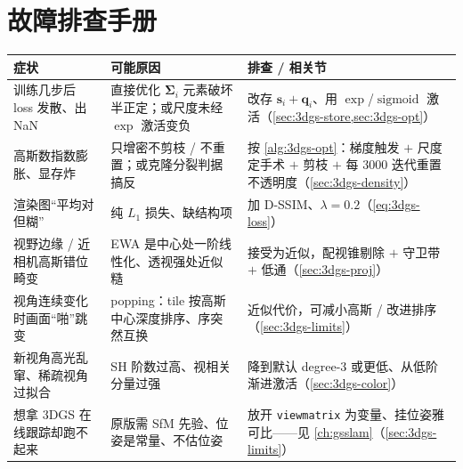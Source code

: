 \section*{故障排查手册}
\begin{table}[H]\centering
\small
\begin{tabular}{@{}p{}p{}p{}@{}}
\toprule
症状 & 可能原因 & 排查 / 相关节 \\
\midrule
训练几步后 loss 发散、出 NaN & 直接优化 $\boldsymbol\Sigma_i$ 元素破坏半正定；或尺度未经 $\exp$ 激活变负 & 改存 $\mathbf s_i+\mathbf q_i$、用 $\exp$/$\operatorname{sigmoid}$ 激活（\cref{sec:3dgs-store,sec:3dgs-opt}）\\
高斯数指数膨胀、显存炸 & 只增密不剪枝 / 不重置；或克隆分裂判据搞反 & 按 \cref{alg:3dgs-opt}：梯度触发 $+$ 尺度定手术 $+$ 剪枝 $+$ 每 $3000$ 迭代重置不透明度（\cref{sec:3dgs-density}）\\
渲染图“平均对但糊” & 纯 $L_1$ 损失、缺结构项 & 加 D-SSIM、$\lambda=0.2$（\cref{eq:3dgs-loss}）\\
视野边缘 / 近相机高斯错位畸变 & EWA 是中心处一阶线性化、透视强处近似糙 & 接受为近似，配视锥剔除 $+$ 守卫带 $+$ 低通（\cref{sec:3dgs-proj}）\\
视角连续变化时画面“啪”跳变 & popping：tile 按高斯中心深度排序、序突然互换 & 近似代价，可减小高斯 / 改进排序（\cref{sec:3dgs-limits}）\\
新视角高光乱窜、稀疏视角过拟合 & SH 阶数过高、视相关分量过强 & 降到默认 degree-3 或更低、从低阶渐进激活（\cref{sec:3dgs-color}）\\
想拿 3DGS 在线跟踪却跑不起来 & 原版需 SfM 先验、位姿是常量、不估位姿 & 放开 \texttt{viewmatrix} 为变量、挂位姿雅可比——见 \cref{ch:gsslam}（\cref{sec:3dgs-limits}）\\
\bottomrule
\end{tabular}
\end{table}
